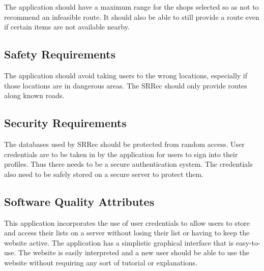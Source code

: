 \documentclass[10pt, a4paper, onecolumn]{scrartcl}
\begin{document}
			The application should have a maximum range for the shops selected so as not to recommend an infeasible route. It should also be able to still provide a route even if certain items are not available nearby.
		
		\subsection{Safety Requirements}
		
			The application should avoid taking users to the wrong locations, especially if those locations are in dangerous areas. The SRRec should only provide routes along known roads.
		
		\subsection{Security Requirements}
		
			The databases used by SRRec should be protected from random access. User credentials are to be taken in by the application for users to sign into their profiles. Thus there needs to be a secure authentication system. The credentials also need to be safely stored on a secure server to protect them.
		
		\subsection{Software Quality Attributes}
			
			This application incorporates the use of user credentials to allow users to store and access their lists on a 	server without losing their list or having to keep the website active. The application has a simplistic graphical interface that is easy-to-use. The website is easily interpreted and a new user should be able to use the website without requiring any sort of tutorial or explanations.
		
%		
		
	
	
	
\end{document}
